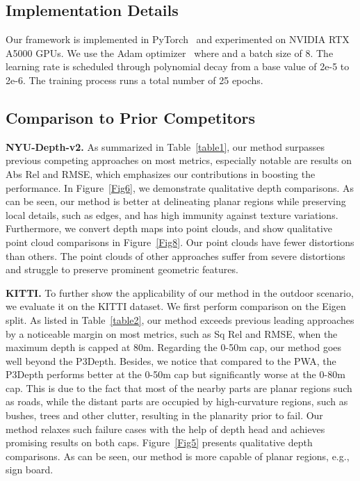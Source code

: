 \documentclass[10pt,twocolumn,letterpaper]{article}
\begin{document}
\subsection{Implementation Details}
Our framework is implemented in PyTorch~\cite{paszke2017automatic} and experimented on NVIDIA RTX A5000 GPUs. We use the Adam optimizer~\cite{kingma2015adam} where  and a batch size of 8. The learning rate is scheduled through polynomial decay from a base value of 2e-5 to 2e-6. The training process runs a total number of 25 epochs.

\subsection{Comparison to Prior Competitors}
\textbf{NYU-Depth-v2.} As summarized in Table~\ref{table1}, our method
surpasses previous competing approaches on most metrics,
especially notable are results on Abs Rel and RMSE, which
emphasizes our contributions in boosting the performance.
In Figure~\ref{Fig6}, we demonstrate qualitative depth comparisons. As
can be seen, our method is better at delineating planar regions while preserving local details, such as edges, and has
high immunity against texture variations. Furthermore, we
convert depth maps into point clouds, and show qualitative
point cloud comparisons in Figure~\ref{Fig8}. Our point clouds have
fewer distortions than others. The point clouds of other approaches suffer from severe distortions and struggle to preserve prominent geometric features. 

\textbf{KITTI.} To further show the applicability of our method
in the outdoor scenario, we evaluate it on the KITTI
dataset. We first perform comparison on the Eigen split.
As listed in Table~\ref{table2}, our method exceeds previous leading approaches by a noticeable margin on most metrics, such as Sq Rel and RMSE, when the maximum depth is capped at 80m. Regarding the 0-50m cap, our method goes well beyond the P3Depth. Besides, we notice that compared to the PWA, the P3Depth performs better at the 0-50m cap but significantly worse at the 0-80m cap. This is due to the fact that most of the nearby parts are planar regions such as roads, while the
distant parts are occupied by high-curvature regions, such
as bushes, trees and other clutter, resulting in the planarity
prior to fail. Our method relaxes such failure cases with the
help of depth head and achieves promising results on both
caps. Figure~\ref{Fig5} presents qualitative depth comparisons. As can
be seen, our method is more capable of planar regions, e.g.,
sign board.
\end{document}
